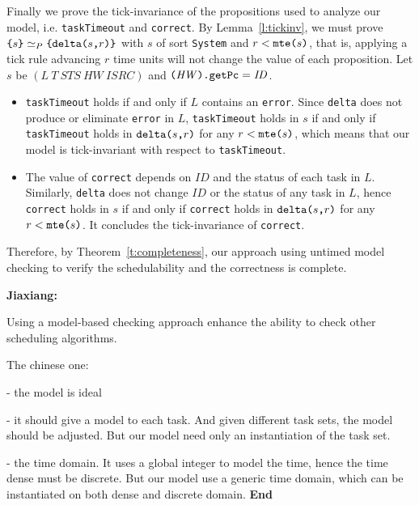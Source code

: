 \documentclass[10pt,journal]{IEEEtran}
\newcommand{\hide}[1]{\ignorespaces}
\newcommand{\jx}[1]{{\bf Jiaxiang: }#1{ \bf End}}
\begin{document}
\begin{IEEEproof}
Finally we prove the tick-invariance of the propositions used to
analyze our model, i.e. \verb|taskTimeout| and \verb|correct|. By
Lemma~\ref{l:tickinv}, we must prove
$\verb|{|s\verb|}|\simeq_P\verb|{|\deltaS{s}{r}\verb|}|$ with $s$ of
sort \verb|System| and $r<\mteS{s}$, that is, applying a tick rule
advancing $r$ time units will not change the value of each
proposition. Let $s$ be
$(\mathit{L}~\mathit{T}~\mathit{STS}~\mathit{HW}~\mathit{ISRC})$ and
$\verb|(|\mathit{HW}\verb|).getPc|=\mathit{ID}$.
\begin{itemize}
\item \verb|taskTimeout| holds if and only if $L$ contains an
  \verb|error|. Since \verb|delta| does not produce or eliminate
  \verb|error| in $L$, \verb|taskTimeout| holds in $s$ if and only if
  \verb|taskTimeout| holds in $\deltaS{s}{r}$ for any $r<\mteS{s}$,
  which means that our model is tick-invariant with respect to
  \verb|taskTimeout|.
\hide{ 
In our model, an \verb|error| cannot be eliminated by any operations,
hence, if \verb|taskTimeout| holds in $s$, it must hold in
$\deltaS{s}{r}$. On the other hand, \verb|error| can pop up only when
operation \verb|update_with_| is applied, i.e., only when the
instantaneous rule \verb|interrupt-handle| applies. If
\verb|taskTimeout| does not hold in $s$, it will not hold either in
$\deltaS{s}{r}$ for any $r<\mteS{s}$, since instantaneous rules cannot
apply in $\deltaS{s}{r'}$ for any $r'<\mteS{s}$ by time-robustness.}
\item The value of \verb|correct| depends on $ID$ and the status of
  each task in $L$. Similarly, \verb|delta| does not change $ID$ or
  the status of any task in $L$, hence \verb|correct| holds in $s$ if
  and only if \verb|correct| holds in $\deltaS{s}{r}$ for any
  $r<\mteS{s}$. It concludes the tick-invariance of \verb|correct|.
\end{itemize}

Therefore, by Theorem~\ref{t:completeness}, our approach using untimed
model checking to verify the schedulability and the correctness is
complete.
\end{IEEEproof}

\jx{

  Using a model-based checking approach enhance the ability to check other scheduling
  algorithms.
  
  The chinese one:

  - the model is ideal

  - it should give a model to each task. And given different task sets, the model should be
  adjusted. But our model need only an instantiation of the task set.

  - the time domain. It uses a global integer to model the time, hence the time dense
  must be discrete. But our model use a generic time domain, which can be instantiated on
  both dense and discrete domain.
}
\end{document}
